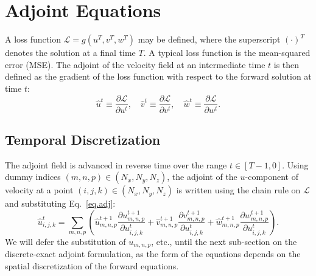 \documentclass[letterpaper,10pt]{article}
\numberwithin{equation}{section}
\newcommand{\pp}[2]{\frac{\partial #1}{\partial #2}}
\newcommand{\wh}[1]{\widehat{#1}}
\begin{document}
\section{Adjoint Equations}

A loss function $\mathcal{L} = g(u^T,v^T,w^T)$ may be defined, where
the superscript $(\cdot)^T$ denotes the solution at a final time
$T$. A typical loss function is the mean-squared error (MSE). The
adjoint of the velocity field at an intermediate time $t$ is then
defined as the gradient of the loss function with respect to the
forward solution at time $t$:
\begin{equation}
  \wh{u}^t \equiv \pp{\mathcal{L}}{u^t},\quad \wh{v}^t \equiv
  \pp{\mathcal{L}}{v^t},\quad \wh{w}^t \equiv \pp{\mathcal{L}}{w^t}.
  \label{eq.adj}
\end{equation}


\subsection{Temporal Discretization}
The adjoint field is advanced in reverse time over the range
$t\in[T-1,0]$. Using dummy indices $(m,n,p)\in (N_x,N_y,N_z)$, the
adjoint of the $u$-component of velocity at a point
$(i,j,k)\in (N_x,N_y,N_z)$ is written using the chain rule on $\mathcal{L}$ and
substituting Eq.~\eqref{eq.adj}:
\begin{equation}
  \wh{u}_{i,j,k}^t = \sum_{m,n,p}\left(
  \wh{u}_{m,n,p}^{t+1}\pp{u_{m,n,p}^{t+1}}{u_{i,j,k}^t} +
  \wh{v}_{m,n,p}^{t+1}\pp{v_{m,n,p}^{t+1}}{u_{i,j,k}^t} +
  \wh{w}_{m,n,p}^{t+1}\pp{w_{m,n,p}^{t+1}}{u_{i,j,k}^t} 
  \right).
  \label{eq.adj_expand}
\end{equation}
We will defer the substitution of $u_{m,n,p}$, etc., until the next
sub-section on the discrete-exact adjoint formulation, as the form of
the equations depends on the spatial discretization of the forward
equations.
\end{document}
